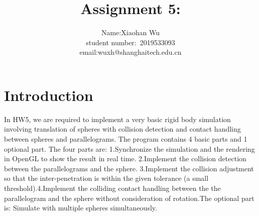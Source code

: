 \documentclass[acmtog]{acmart}
\title{Assignment 5:\\ {}}
\author{Name:\quad Xiaohan Wu  \\ student number:\ 2019533093
\\email:\quad wuxh@shanghaitech.edu.cn}
\begin{document}
\maketitle

\vspace*{2 ex}

\section{Introduction}
\qquad In HW5, we are required to implement a very basic rigid body simulation involving translation of spheres with collision detection and contact handling between spheres and parallelograms. The program contains 4 basic parts and 1 optional part. The four parts are: 1.Synchronize the simulation and the rendering in OpenGL to show the result in real time.
2.Implement the collision detection between the parallelograms and the sphere.
3.Implement the collision adjustment so that the inter-penetration is within the given tolerance (a small threshold).4.Implement the colliding contact handling between the the parallelogram and the sphere without consideration of rotation.The optional part is: Simulate with multiple spheres simultaneously.
\end{document}
